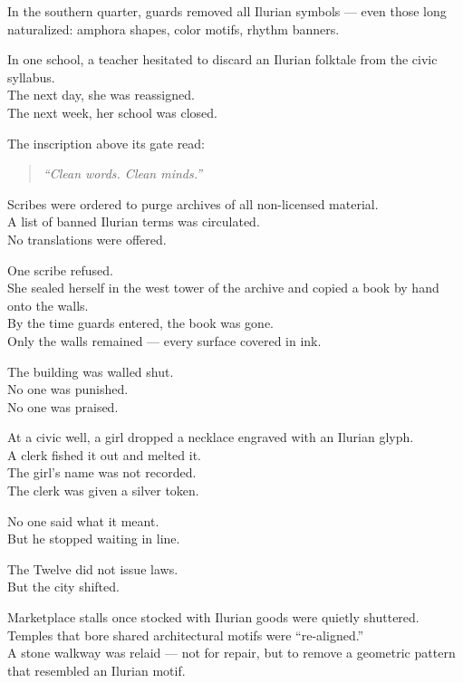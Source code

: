 \documentclass[9pt]{article}
\begin{document}
In the southern quarter, guards removed all Ilurian symbols — even those long naturalized: amphora shapes, color motifs, rhythm banners.

In one school, a teacher hesitated to discard an Ilurian folktale from the civic syllabus.\\
The next day, she was reassigned.\\
The next week, her school was closed.

The inscription above its gate read:

\begin{quote}
\textit{“Clean words. Clean minds.”}
\end{quote}

\vspace{1em}

Scribes were ordered to purge archives of all non-licensed material.\\
A list of banned Ilurian terms was circulated.\\
No translations were offered.

One scribe refused.\\
She sealed herself in the west tower of the archive and copied a book by hand onto the walls.\\
By the time guards entered, the book was gone.\\
Only the walls remained — every surface covered in ink.

The building was walled shut.\\
No one was punished.\\
No one was praised.

\vspace{1em}

At a civic well, a girl dropped a necklace engraved with an Ilurian glyph.\\
A clerk fished it out and melted it.\\
The girl’s name was not recorded.\\
The clerk was given a silver token.

No one said what it meant.\\
But he stopped waiting in line.

\vspace{1em}

The Twelve did not issue laws.\\
But the city shifted.

Marketplace stalls once stocked with Ilurian goods were quietly shuttered.\\
Temples that bore shared architectural motifs were “re-aligned.”\\
A stone walkway was relaid — not for repair, but to remove a geometric pattern that resembled an Ilurian motif.
\end{document}
